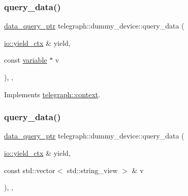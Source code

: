 \mbox{\label{classtelegraph_1_1dummy__device_a23b7704d488ca5e9ac732256621e8137}} 
\subsubsection{\texorpdfstring{query\+\_\+data()}{query\_data()}\hspace{0.1cm}{\footnotesize\ttfamily [1/2]}}
{\footnotesize\ttfamily \hyperlink{namespacetelegraph_a6ffe775ac48dca2a4013b53d692199c8}{data\+\_\+query\+\_\+ptr} telegraph\+::dummy\+\_\+device\+::query\+\_\+data (\begin{DoxyParamCaption}\item[{\hyperlink{structboost_1_1asio_1_1yield__ctx}{io\+::yield\+\_\+ctx} \&}]{yield,  }\item[{const \hyperlink{classtelegraph_1_1variable}{variable} $\ast$}]{v }\end{DoxyParamCaption})\hspace{0.3cm}{\ttfamily [inline]}, {\ttfamily [override]}, {\ttfamily [virtual]}}



Implements \hyperlink{classtelegraph_1_1context_a301114c9b73194507ae58221566a3e57}{telegraph\+::context}.

\mbox{\label{classtelegraph_1_1dummy__device_ae7820cd8f1d5683ccc90b7256e88a735}} 
\subsubsection{\texorpdfstring{query\+\_\+data()}{query\_data()}\hspace{0.1cm}{\footnotesize\ttfamily [2/2]}}
{\footnotesize\ttfamily \hyperlink{namespacetelegraph_a6ffe775ac48dca2a4013b53d692199c8}{data\+\_\+query\+\_\+ptr} telegraph\+::dummy\+\_\+device\+::query\+\_\+data (\begin{DoxyParamCaption}\item[{\hyperlink{structboost_1_1asio_1_1yield__ctx}{io\+::yield\+\_\+ctx} \&}]{yield,  }\item[{const std\+::vector$<$ std\+::string\+\_\+view $>$ \&}]{v }\end{DoxyParamCaption})\hspace{0.3cm}{\ttfamily [inline]}, {\ttfamily [override]}, {\ttfamily [virtual]}}



